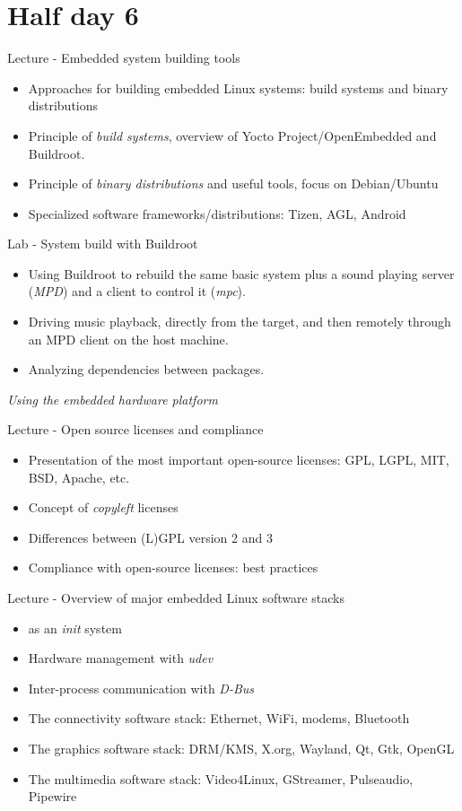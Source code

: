 \documentclass[a4paper,12pt,obeyspaces,spaces,hyphens]{article}
\begin{document}
\section{Half day 6}

\feagendatwocolumn
{Lecture - Embedded system building tools}
{
  \begin{itemize}
  \item Approaches for building embedded Linux systems: build systems
    and binary distributions
  \item Principle of {\em build systems}, overview of Yocto
    Project/OpenEmbedded and Buildroot.
  \item Principle of {\em binary distributions} and useful tools,
    focus on Debian/Ubuntu
  \item Specialized software frameworks/distributions: Tizen, AGL,
    Android
  \end{itemize}
}
{Lab - System build with Buildroot}
{
  \begin{itemize}
  \item Using Buildroot to rebuild the same basic system
        plus a sound playing server ({\em MPD}) and a
        client to control it ({\em mpc}).
  \item Driving music playback, directly from the target,
        and then remotely through an MPD client on the
	host machine.
  \item Analyzing dependencies between packages.
  \end{itemize}

  \vspace{0.5cm}
  {\em Using the embedded hardware platform}
}

\feagendaonecolumn
{Lecture - Open source licenses and compliance}
{
  \begin{itemize}
  \item Presentation of the most important open-source licenses: GPL,
    LGPL, MIT, BSD, Apache, etc.
  \item Concept of {\em copyleft} licenses
  \item Differences between (L)GPL version 2 and 3
  \item Compliance with open-source licenses: best practices
  \end{itemize}
}

\feagendaonecolumn
{Lecture - Overview of major embedded Linux software stacks}
{
  \begin{itemize}
  \item {} as an {\em init} system
  \item Hardware management with {\em udev}
  \item Inter-process communication with {\em D-Bus}
  \item The connectivity software stack: Ethernet, WiFi, modems,
    Bluetooth
  \item The graphics software stack: DRM/KMS, X.org, Wayland, Qt, Gtk,
    OpenGL
  \item The multimedia software stack: Video4Linux, GStreamer,
    Pulseaudio, Pipewire
  \end{itemize}
}
\end{document}
